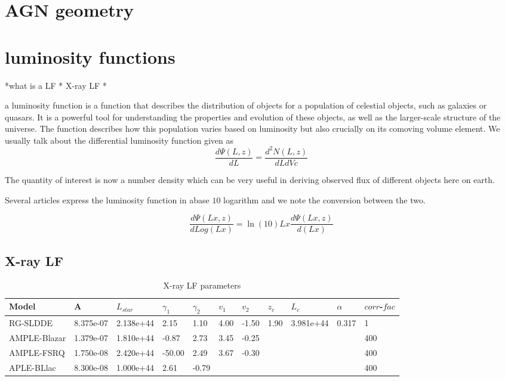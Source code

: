 \documentclass[11pt]{article}
\begin{document}
\section{AGN geometry}

\section{ luminosity functions}

*what is a LF
* X-ray LF 
* 

a luminosity function is a function that describes the distribution of objects for a population of celestial objects,
such as galaxies or quasars. It is a powerful tool for understanding the properties and evolution of 
these objects, as well as the larger-scale structure of the universe. 
The function describes how this population varies based on luminosity but also crucially on its comoving volume element. 
 We usually talk about the differential luminosity function given as
\begin{equation}
    \frac{d\Psi(L,z)}{dL} = \frac{d^2N(L,z)}{dLdVc}
\end{equation}

The quantity of interest is now a number density which can be very useful in deriving observed flux of different objects here on earth. 

Several articles express the luminosity function in abase $10$ logarithm and we note the conversion between the two. 

\begin{equation}
    \frac{d\Psi(Lx,z)}{dLog(Lx)} =  \ln (10)  Lx \frac{d\Psi(Lx,z)}{d(Lx)}
\end{equation}

\subsection{X-ray LF}

\begin{table}
\tiny
\begin{tabularx}{\textwidth}{|X|X|X|X|X|X|X|X|X|X|X|}
\hline
Model & A & $L_{star}$ & $\gamma _1$ &  $\gamma _2$  & $v_1$ & $v_2$ & $z_c$ & $L_c$ & $ \alpha$ & $corr$-$fac$ \\
\hline
RG-SLDDE & 8.375e-07 & 2.138e+44 & 2.15 & 1.10 & 4.00 & -1.50 & 1.90 & 3.981e+44 & 0.317 & 1 \\
\hline
AMPLE-Blazar & 1.379e-07 & 1.810e+44 & -0.87 & 2.73 & 3.45 & -0.25 & & & & 400 \\
\hline
AMPLE-FSRQ & 1.750e-08 & 2.420e+44 & -50.00 & 2.49 & 3.67 & -0.30 & & & & 400 \\
\hline
APLE-BLlac & 8.300e-08 & 1.000e+44 & 2.61 & -0.79 & & & & & &400 \\
\hline
\end{tabularx}
\caption{X-ray LF parameters}
\end{table}
\end{document}
